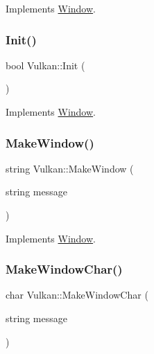 Implements \mbox{\hyperlink{classWindow_a5332552d06a88b58486c0ab803356d01}{Window}}.

\mbox{\label{classVulkan_a308c68e03405bc740435a2af62cc7434}} 
\subsubsection{\texorpdfstring{Init()}{Init()}}
{\footnotesize\ttfamily bool Vulkan\+::\+Init (\begin{DoxyParamCaption}{ }\end{DoxyParamCaption})\hspace{0.3cm}{\ttfamily [virtual]}}



Implements \mbox{\hyperlink{classWindow_a91ad1340d4f60465f0e6eef38f0e5fb1}{Window}}.

\mbox{\label{classVulkan_a46c4ec53f8960a1fa3f3eb63d7755654}} 
\subsubsection{\texorpdfstring{Make\+Window()}{MakeWindow()}}
{\footnotesize\ttfamily string Vulkan\+::\+Make\+Window (\begin{DoxyParamCaption}\item[{string}]{message }\end{DoxyParamCaption})\hspace{0.3cm}{\ttfamily [virtual]}}



Implements \mbox{\hyperlink{classWindow_a3a24c6368cb054a5ca3b32db2558319f}{Window}}.

\mbox{\label{classVulkan_a70565678cd6771ac57706ff8586e256f}} 
\subsubsection{\texorpdfstring{Make\+Window\+Char()}{MakeWindowChar()}}
{\footnotesize\ttfamily char Vulkan\+::\+Make\+Window\+Char (\begin{DoxyParamCaption}\item[{string}]{message }\end{DoxyParamCaption})\hspace{0.3cm}{\ttfamily [virtual]}}



